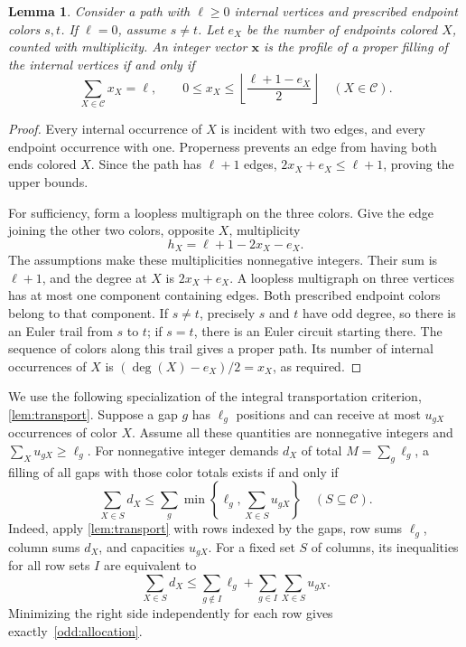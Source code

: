 \documentclass[11pt,reqno]{amsart}
\numberwithin{equation}{section}
\newtheorem{lemma}[theorem]{Lemma}
\theoremstyle{definition}
\theoremstyle{remark}
\begin{document}
\begin{lemma}\label{odd:gap}
Consider a path with $\ell\ge0$ internal vertices and prescribed endpoint
colors $s,t$. If $\ell=0$, assume $s\ne t$. Let $e_X$ be the number of
endpoints colored $X$, counted with multiplicity. An integer vector
$\mathbf x$ is the profile of a proper filling of the internal vertices
if and only if
\begin{equation}\label{odd:gapeq}
\sum_{X\in\mathcal C}x_X=\ell,
\qquad
0\le x_X\le
\left\lfloor\frac{\ell+1-e_X}{2}\right\rfloor
\quad(X\in\mathcal C).
\end{equation}
\end{lemma}
\begin{proof}
Every internal occurrence of $X$ is incident with two edges, and
every endpoint occurrence with one. Properness prevents an edge from
having both ends colored $X$. Since the path has $\ell+1$ edges,
$2x_X+e_X\le\ell+1$, proving the upper bounds.

For sufficiency, form a loopless multigraph on the three colors. Give
the edge joining the other two colors, opposite $X$, multiplicity
\[
h_X=\ell+1-2x_X-e_X.
\]
The assumptions make these multiplicities nonnegative integers.
Their sum is $\ell+1$, and the degree at $X$ is $2x_X+e_X$.
A loopless multigraph on three vertices has at most one component
containing edges. Both prescribed endpoint colors belong to that
component. If $s\ne t$, precisely $s$ and $t$ have odd degree, so
there is an Euler trail from $s$ to $t$; if $s=t$, there is an Euler
circuit starting there. The sequence of colors along this trail gives
a proper path. Its number of internal occurrences of $X$ is
$(\deg(X)-e_X)/2=x_X$, as required.
\end{proof}

We use the following specialization of the integral transportation
criterion, \cref{lem:transport}. Suppose a gap $g$ has $\ell_g$
positions and can receive at most $u_{gX}$ occurrences of color $X$.
Assume all these quantities are nonnegative integers and
$\sum_Xu_{gX}\ge\ell_g$. For nonnegative integer demands $d_X$ of total
$M=\sum_g\ell_g$, a filling of all gaps with those color totals exists
if and only if
\begin{equation}\label{odd:allocation}
\sum_{X\in S}d_X
\le\sum_g\min\left\{\ell_g,\sum_{X\in S}u_{gX}\right\}
\quad(S\subseteq\mathcal C).
\end{equation}
Indeed, apply \cref{lem:transport} with rows indexed by the gaps,
row sums $\ell_g$, column sums $d_X$, and capacities $u_{gX}$.
For a fixed set $S$ of columns, its inequalities for all row sets $I$
are equivalent to
\[
\sum_{X\in S}d_X
\le \sum_{g\notin I}\ell_g+
    \sum_{g\in I}\sum_{X\in S}u_{gX}.
\]
Minimizing the right side independently for each row gives
exactly~\eqref{odd:allocation}.
\end{document}

